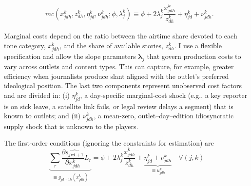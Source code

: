 \documentclass[12pt]{article}
\begin{document}
\begin{equation*}\label{}
	\begin{aligned}
		& mc(x_{jdh}^k,z_{dh}^k,\eta_{jd}^k,\nu_{jdh}^k; \phi,\lambda_j^k )\equiv   \phi +   2\lambda_j^k  \dfrac{x_{jdh}^k}{z_{dh}^k} + \eta_{jd}^k + \nu_{jdh}^k.
	\end{aligned}
	\end{equation*} 


Marginal costs depend on the ratio between the airtime share devoted to each tone category, $x_{jdh}^k$, and the share of available stories, $z_{dh}^k$. I use a flexible specification and allow the slope parameters $\bm{\lambda}_j$ that govern production costs to vary across outlets and content types. This can capture, for example, greater efficiency when journalists produce slant aligned with the outlet’s preferred ideological position. The last two components represent unobserved cost factors and are divided in: (i) $\eta_{jd}^k$, a {day-specific} marginal-cost shock (e.g., a key reporter is on sick leave, a satellite link fails, or legal review delays a segment) that is known to outlets; and (ii) $\nu_{jdh}^k$, a mean-zero, outlet–day–edition idiosyncratic supply shock that is unknown to the players.



 
 
 
 


The first-order conditions (ignoring the  constraints for estimation) are
\begin{equation}\label{eq:focs}
	\underbrace{\sum_{r}\frac{\partial \widehat{s_{jrd+1}}}{\partial x_{jdh}^k}L_r}_{\equiv g_{jd+1h}(x_{jdh}^k)}
	= \phi + 2\lambda_j^k\frac{x_{jdh}^k}{z_{dh}^k}  
	+ \underbrace{\eta_{jd}^k+\nu_{jdh}^k}_{\equiv u_{jdh}^k}
	\quad \forall(j,k)
\end{equation}
\end{document}
